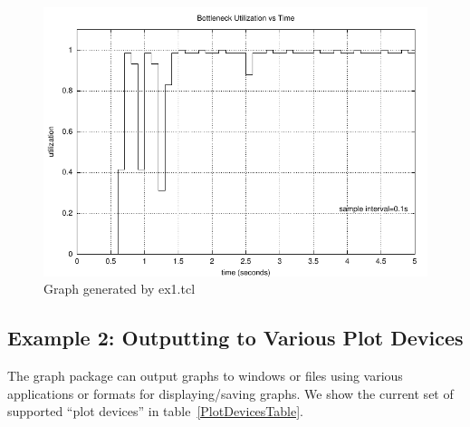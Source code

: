 \documentclass[11pt]{article}
\begin{document}
\begin{figure}[!ht]
\centerline{\includegraphics[width=4.5in]{utilization-vs-time}}
\caption{Graph generated by ex1.tcl}\label{Ex1UtilFigure}
\end{figure}


\subsection{Example 2: Outputting to Various Plot Devices}

The graph package can output graphs to windows or files using 
various applications or formats for displaying/saving graphs.  We show
the current set of supported ``plot devices'' in
table~\ref{PlotDevicesTable}.
\end{document}
